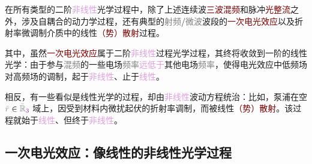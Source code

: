 在所有类型的二阶\textcolor{Plum}{非线性}光学过程中，除了上述连续波\textcolor{Maroon}{三波混频}和\textcolor{NavyBlue}{脉冲}\textcolor{Maroon}{光整流}之外，涉及\textcolor{NavyBlue}{自耦合}的动力学过程，还有典型的\textcolor{gray}{射频}/\textcolor{gray}{微波}波段的\textcolor{Maroon}{一次电光效应}以及\textcolor{PineGreen}{折射率微调制}介质中的线性\textcolor{Maroon}{（势）散射}过程。

其中，虽然\textcolor{Maroon}{一次电光效应}属于二阶\textcolor{Plum}{非线性}过程光学过程，其终将收敛到一阶的\textcolor{PineGreen}{线性光学}：由于参与\textcolor{gray}{混频}的一些电场\textcolor{gray}{频率}\textcolor{Plum}{远低于}其他电场\textcolor{gray}{频率}，使得电光效应中\textcolor{NavyBlue}{低频场}对\textcolor{NavyBlue}{高频场}的调制，起于\textcolor{Plum}{非线性}、止于\textcolor{Plum}{线性}。

相反，有一些看似是\textcolor{PineGreen}{线性光学}的过程，却由\textcolor{Plum}{非线性}波动方程统治：比如，\textcolor{NavyBlue}{泵浦}在空 $\mathcolor{gray}{\bar{r}} \in \mathcolor{gray}{\bar{\mathbb{R}}_{\textcolor{Plum}{3}}}$ 域上，因受到材料内\textcolor{NavyBlue}{微扰起伏}的\textcolor{PineGreen}{折射率}\textcolor{NavyBlue}{调制}，而被线性\textcolor{Maroon}{（势）散射}。该过程就始于\textcolor{Plum}{线性}、但终于\textcolor{Plum}{非线性}。

\subsection{一次电光效应：像线性的非线性光学过程}\label{ssec:cross-correlation}

